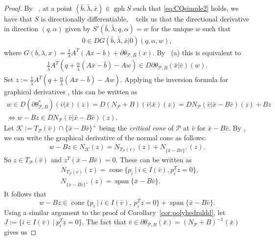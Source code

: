 \documentclass[reqno]{amsart}
\numberwithin{equation}{section}
\newcommand{\pol}{\mathcal{P}}
\newcommand{\tpb}{\theta_{\mathcal{P},B}}
\newcommand{\gph}{\operatorname{gph}}
\begin{document}
\begin{proof}
    By ~, at a point $(\bar{b}, \bar{\lambda}, \bar{x}) \in \gph S$ such that \eqref{eq:CQsimple2} holds, we have that $S$ is directionally 
differentiable, ~ tells us that the directional derivative in direction $(q, \alpha)$ given by 
$S'(\bar{b}, \bar{\lambda}; q, \alpha) = w$ for the unique $w$ such that
\begin{align}\label{eq:0DG}
    0 \in D G(\bar{b}, \bar{\lambda}, \bar{x} | 0)(q, \alpha, w),
\end{align}
where $G(b, \lambda, x) = \frac{1}{\lambda} A^T(Ax - b) + \partial \tpb (x)$.
By ~(a) this is equivalent to \begin{align*}
    \frac{1}{\bar{\lambda}} A^T(q + \frac{\alpha}{\bar{\lambda}}(A \bar{x} - \bar{b}) - Aw) \in D \partial \tpb (\bar{x} | \bar{v})(w).
\end{align*} Set $z := \frac{1}{\bar{\lambda}} A^T(q + \frac{\alpha}{\bar{\lambda}}(A \bar{x} - \bar{b}) - Aw)$. Applying the inversion formula for graphical derivatives \cite[8(19)]{RoW 98}, this can be written as \begin{align*}
    w \in D(\partial \tpb^*)(\bar{v} | \bar{x})(z) = D(N_{\pol} + B)(\bar{v} | \bar{x})(z) = D N_{\pol} (\bar{v} | \bar{x} - B \bar{v})(z) + Bz \\
    \iff w - Bz \in D N_{\pol} (\bar{v} | \bar{x} - B \bar{v})(z).
\end{align*} Let $\mathcal{K} := T_{\pol}(\bar{v}) \cap \{\bar{x} - B\bar{v}\}^{\bot}$ being the {\em critical cone} of $\pol$ at $\bar v$ for $\bar{x} - B\bar{v}$.
By \cite[Example 13.44]{RoW 98}, we can write the graphical derivative of the normal cone as follows:
\begin{align*}
    w - Bz \in N_{\mathcal{K}}(z) = N_{T_{\pol}(\bar{v})}(z) + N_{\{\bar{x} - B \bar{v}\}^{\bot}}(z).
\end{align*} So $z \in T_{\pol}(\bar{v})$ and $z^T(\bar{x} - B \bar{v}) = 0$. These can be written as \begin{align*}
    &N_{T_{\pol}(v)}(z) = \operatorname{cone} \{p_i \ | \ i \in I(\bar{v}), p_i^Tz = 0\},\\
    &N_{\{\bar{x} - B \bar{v}\}^{\bot}}(z) = \operatorname{span}\{\bar{x} - B \bar{v}\}.
\end{align*} 
It follows that 
\[
w - Bz \in \operatorname{cone} \{p_i \ | \ i \in I(\bar{v}), \ p_i^Tz = 0\} + \operatorname{span}\{\bar{x} - B \bar{v}\}.
\]
Using a similar argument to the proof of Corollary~\ref{cor:polyhedraldd}, let $J := \{i \in I(\bar{v}) \ | \ p_i^Tz = 0\}$. The fact that $\bar{v} \in \partial \tpb (\bar{x}) = (N_{\pol} + B)^{-1}(\bar{x})$ gives us 

\end{proof}
\end{document}
